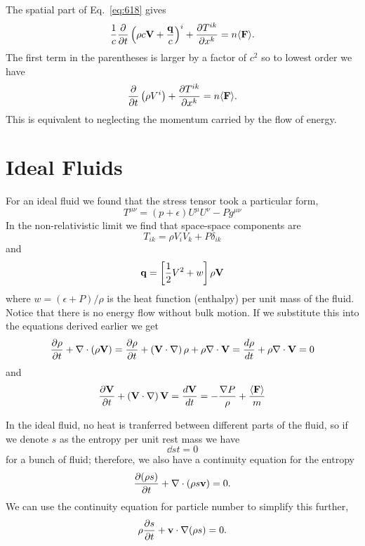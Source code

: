 The spatial part of Eq.~\ref{eq:618} gives
\begin{equation}
\frac{1}{c} \frac{\partial {}}{\partial {t}} \left ( \rho c {\bf V} + \frac{\bf q}{c} \right
)^i + \frac{\partial {T^{ik}}}{\partial {x^k}} = n \langle {\bf F} \rangle.
\label{eq:625}
\end{equation}
The first term in the parentheses is larger by a factor of $c^2$ so to
lowest order we have
\begin{equation}
\frac{\partial {}}{\partial {t}} \left ( \rho V^i \right ) + \frac{\partial {T^{ik}}}{\partial {x^k}} = n \langle {\bf F} \rangle.
\label{eq:626}
\end{equation}
This is equivalent to neglecting the momentum carried by the flow of 
energy.

\section{Ideal Fluids}
\label{sec:ideal-fluids}
For an ideal fluid we found that the stress tensor took a particular
form,
\begin{equation}
T^{\mu\nu} = (p + \epsilon) U^\mu U^\nu - P g^{\mu\nu}
\label{eq:627}
\end{equation}
In the non-relativistic limit we find that space-space components are
\begin{equation}
T_{ik} = \rho V_i V_k + P \delta_{ik}
\label{eq:628}
\end{equation}
and
\begin{equation}
{\bf q} = \left [ \frac{1}{2} V^2 + w \right ] \rho {\bf V}
\label{eq:629}
\end{equation}
where $w=(\epsilon + P)/\rho$ is the heat function (enthalpy) per
unit mass of the fluid. Notice that there is no energy flow without
bulk motion.  If we substitute this into the equations
derived earlier we get
\begin{equation}
\frac{\partial {\rho}}{\partial {t}} + \nabla \cdot \left ( \rho {\bf V} \right ) = 
\frac{\partial {\rho}}{\partial {t}} + \left ( {\bf V} \cdot \nabla \right ) \rho 
+ \rho \nabla \cdot {\bf V} =
\frac{d {\rho}}{d {t}} + \rho \nabla \cdot {\bf V} = 0
\label{eq:630}
\end{equation}
and
\begin{equation}
\frac{\partial {{\bf V}}}{\partial {t}} + \left ( {\bf V} \cdot \nabla \right ) {\bf V} =
\frac{d {\bf V}}{d {t}} = -\frac{\nabla P}{\rho} + \frac{\langle {\bf F} \rangle}{m}
\label{eq:631}
\end{equation}

In the ideal fluid, no heat is tranferred between different parts of
the fluid, so if we denote $s$ as the entropy per unit rest mass we have
\begin{equation}
\dd{s}{t} = 0
\label{eq:632}
\end{equation}
for a bunch of fluid; therefore, we also have a continuity equation
for the entropy
\begin{equation}
\frac{\partial {(\rho s)}}{\partial {t}} + \nabla \cdot \left ( \rho s {\bf v} \right ) = 0.
\label{eq:633}
\end{equation}
We can use the continuity equation for particle number to simplify
this further,
\begin{equation}
\rho \frac{\partial {s}}{\partial {t}} + {\bf v} \cdot \nabla (\rho s) = 0.
\label{eq:634}
\end{equation}

